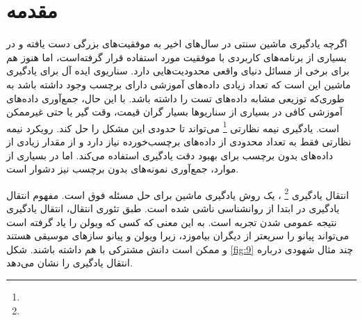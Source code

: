 \section{مقدمه}
{
	اگرچه یادگیری ماشین سنتی در سال‌های اخیر به موفقیت‌های بزرگی دست یافته و در بسیاری از برنامه‌های کاربردی با موفقیت مورد استفاده قرار گرفته‌است، اما هنوز هم برای برخی از مسائل دنیای واقعی محدودیت‌هایی دارد. سناریوی ایده آل برای یادگیری ماشین این است که تعداد زیادی داده‌های آموزشی دارای برچسب وجود داشته باشد به طوری‌که توزیعی مشابه داده‌های تست  را داشته باشد. با این حال، جمع‌آوری داده‌های آموزشی کافی در بسیاری از سناریوها بسیار گران قیمت، وقت گیر یا حتی غیرممکن است. یادگیری نیمه نظارتی
	\footnote{}
	 می‌تواند تا حدودی این مشکل را حل کند. رویکرد نیمه نظارتی فقط به تعداد محدودی از داده‌های برچسب‌‌‌خورده نیاز دارد و از مقدار زیادی از داده‌های بدون برچسب برای بهبود دقت یادگیری استفاده می‌کند. اما در بسیاری از موارد، جمع‌آوری نمونه‌های بدون برچسب نیز دشوار است.
	\cite{zhuang2020comprehensive}
	
	
	انتقال یادگیری
	\footnote{}
	، یک روش یادگیری ماشین برای حل مسئله فوق است. مفهوم انتقال یادگیری در ابتدا از روانشناسی ناشی شده است. طبق تئوری انتقال، انتقال یادگیری نتیجه عمومی شدن تجربه است. به  این معنی که کسی که ویولن را یاد گرفته است می‌تواند پیانو را سریعتر از دیگران بیاموزد، زیرا ویولن و پیانو سازهای موسیقی هستند و ممکن است دانش مشترکی با هم داشته باشند. شکل
	\ref{fig:9}
	چند مثال شهودی درباره انتقال یادگیری را نشان می‌دهد.
	
}
